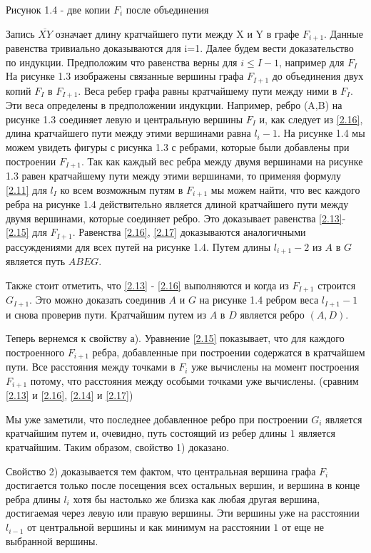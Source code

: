 \documentclass[a4paper, 14pt]{extarticle}
\numberwithin{equation}{section}
\begin{document}
\begin{center}
Рисунок 1.4 - две копии $F_i$ после объединения
\end{center}


Запись $\overline {XY}$ означает длину кратчайшего пути между X и Y в графе $F_{i+1}$. Данные равенства тривиально доказываются для i=1. Далее будем вести доказательство по индукции. Предположим что равенства верны для $i \leq I-1$, например для $F_I$ На рисунке 1.3 изображены связанные вершины графа $F_{I+1}$ до объединения двух копий $F_I$ в $F_{I+1}$. Веса ребер графа равны кратчайшему пути между ними в $F_I$. Эти веса определены в предположении индукции. Например, ребро (A,B) на рисунке 1.3 соединяет левую и центральную вершины $F_I$ и, как следует из \eqref{2.16}, длина кратчайшего пути между этими вершинами равна $l_i-1$. На рисунке 1.4 мы можем увидеть фигуры с рисунка 1.3 с ребрами, которые были добавлены при построении $F_{I+1}$. Так как каждый вес ребра между двумя вершинами на рисунке 1.3 равен кратчайшему пути между этими вершинами, то применяя формулу \eqref{2.11} для $l_I$ ко всем возможным путям в $F_{i+1}$ мы можем найти, что вес каждого ребра на рисунке 1.4  действительно является длиной кратчайшего пути между двумя вершинами, которые соединяет ребро. Это доказывает равенства \ref{2.13}-\ref{2.15} для $F_{I+1}$. Равенства \ref{2.16}, \ref{2.17} доказываются аналогичными рассуждениями для всех путей на рисунке 1.4. Путем длины $l_{i+1}-2$ из $A$ в $G$ является путь $ABEG$.

Также стоит отметить, что  \ref{2.13} - \ref{2.16} выполняются и когда из $F_{I+1}$ строится $G_{I+1}$. Это можно доказать соединив $A$ и $G$ на рисунке 1.4 ребром веса $l_{I+1}-1$ и снова проверив пути. Кратчайшим путем из $A$ в $D$ является ребро $(A,D)$.

Теперь вернемся к свойству а). Уравнение \eqref{2.15} показывает, что для каждого построенного $F_{i+1}$ ребра, добавленные при построении содержатся в кратчайшем пути. Все расстояния между точками в $F_i$ уже вычислены на момент построения $F_{i+1}$ потому, что расстояния между особыми точками уже вычислены. (сравним \eqref{2.13} и \eqref{2.16}, \eqref{2.14} и \eqref{2.17})

Мы уже заметили, что последнее добавленное ребро при построении $G_i$ является кратчайшим путем и, очевидно, путь состоящий из ребер длины $1$ является кратчайшим. Таким образом, свойство 1) доказано.

Свойство 2) доказывается тем фактом, что центральная вершина графа $F_i$ достигается только после посещения всех остальных вершин, и вершина в конце ребра длины $l_i$ хотя бы настолько же близка как любая другая вершина, достигаемая через левую или правую вершины. Эти вершины уже на расстоянии $l_{i-1}$ от центральной вершины и как минимум на расстоянии $1$ от еще не выбранной вершины. \\
\end{document}
